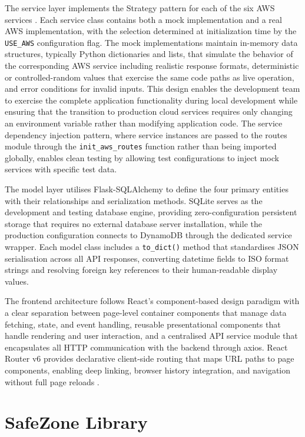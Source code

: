 \documentclass[conference]{IEEEtran}
\begin{document}
The service layer implements the Strategy pattern for each of the six AWS services \cite{gamma1994design}. Each service class contains both a mock implementation and a real AWS implementation, with the selection determined at initialization time by the \texttt{USE\_AWS} configuration flag. The mock implementations maintain in-memory data structures, typically Python dictionaries and lists, that simulate the behavior of the corresponding AWS service including realistic response formats, deterministic or controlled-random values that exercise the same code paths as live operation, and error conditions for invalid inputs. This design enables the development team to exercise the complete application functionality during local development while ensuring that the transition to production cloud services requires only changing an environment variable rather than modifying application code. The service dependency injection pattern, where service instances are passed to the routes module through the \texttt{init\_aws\_routes} function rather than being imported globally, enables clean testing by allowing test configurations to inject mock services with specific test data.

The model layer utilises Flask-SQLAlchemy to define the four primary entities with their relationships and serialization methods. SQLite serves as the development and testing database engine, providing zero-configuration persistent storage that requires no external database server installation, while the production configuration connects to DynamoDB through the dedicated service wrapper. Each model class includes a \texttt{to\_dict()} method that standardises JSON serialisation across all API responses, converting datetime fields to ISO format strings and resolving foreign key references to their human-readable display values.

The frontend architecture follows React's component-based design paradigm with a clear separation between page-level container components that manage data fetching, state, and event handling, reusable presentational components that handle rendering and user interaction, and a centralised API service module that encapsulates all HTTP communication with the backend through axios. React Router v6 provides declarative client-side routing that maps URL paths to page components, enabling deep linking, browser history integration, and navigation without full page reloads \cite{reactrouter2023}.

\section{SafeZone Library}
\end{document}
